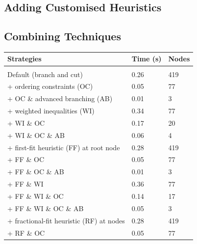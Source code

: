 \newpage\subsection{Adding Customised Heuristics} \label{sbs:heuristics}


\subsection{Combining Techniques} \label{sbs:combine}

\begin{table}[ht]
\begin{center}
\begin{tabular}[c]{|lll|}
\hline
\textbf{Strategies}																 & \textbf{Time (s)}	& \textbf{Nodes} \\ 
\hline & &\\[-10pt]
Default (branch and cut)                           & 0.26							  & 419 \\
\hline
+ ordering constraints (OC)                        & 0.05 							& 77 \\
+ OC \& advanced branching (AB)                    & 0.01 							& 3 \\
\hline
+ weighted inequalities (WI)                       & 0.34 							& 77 \\
+ WI \& OC                                         & 0.17 							& 20 \\
+ WI \& OC \& AB                                   & 0.06 							& 4 \\
\hline
+ first-fit heuristic (FF) at root node            & 0.28 							& 419 \\
+ FF \& OC                                         & 0.05 							& 77 \\
+ FF \& OC \& AB                                   & 0.01 							& 3 \\
\hline
+ FF \& WI                                         & 0.36 							& 77 \\
+ FF \& WI \& OC                                   & 0.14 							& 17 \\
+ FF \& WI \& OC \& AB                             & 0.05 							& 3 \\
\hline
+ fractional-fit heuristic (RF) at nodes           & 0.28 							& 419 \\
+ RF \& OC                                         & 0.05 							& 77 \\

\end{tabular}
\end{center}
\end{table}
